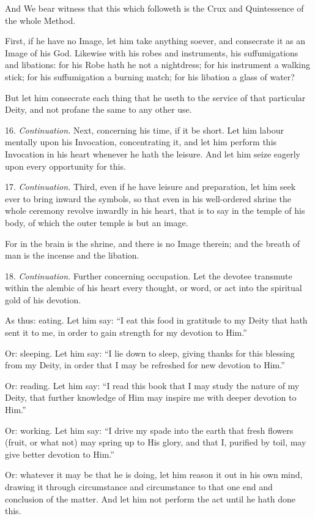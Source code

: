 And We bear witness that this which followeth is the Crux and Quin\-tess\-ence of the whole Method.

First, if he have no Image, let him take anything soever, and consecrate it as an Image of his God. Likewise with his robes and instruments, his suffumigations and libations: for his Robe hath he not a nightdress; for his instrument a walking stick; for his suffumigation a burning match; for his libation a glass of water?

But let him consecrate each thing that he useth to the service of that particular Deity, and not profane the same to any other use.

16. \textit{Continuation.} Next, concerning his time, if it be short. Let him labour mentally upon his Invocation, concentrating it, and let him perform this Invocation in his heart whenever he hath the leisure. And let him seize eagerly upon every opportunity for this.

17. \textit{Continuation.} Third, even if he have leisure and preparation, let him seek ever to bring inward the symbols, so that even in his well-ordered shrine the whole ceremony revolve inwardly in his heart, that is to say in the temple of his body, of which the outer temple is but an image.

For in the brain is the shrine, and there is no Image therein; and the breath of man is the incense and the libation.

18. \textit{Continuation.} Further concerning occupation. Let the devotee transmute within the alembic of his heart every thought, or word, or act into the spiritual gold of his devotion.

As thus: eating. Let him say: \enquote{I eat this food in gratitude to my Deity that hath sent it to me, in order to gain strength for my devotion to Him.}

Or: sleeping. Let him say: \enquote{I lie down to sleep, giving thanks for this blessing from my Deity, in order that I may be refreshed for new devotion to Him.}

Or: reading. Let him say: \enquote{I read this book that I may study the nature of my Deity, that further knowledge of Him may inspire me with deeper devotion to Him.}

Or: working. Let him say: \enquote{I drive my spade into the earth that fresh flowers (fruit, or what not) may spring up to His glory, and that I, purified by toil, may give better devotion to Him.}

Or: whatever it may be that he is doing, let him reason it out in his own mind, drawing it through circumstance and circumstance to that one end and conclusion of the matter. And let him not perform the act until he hath done this.

